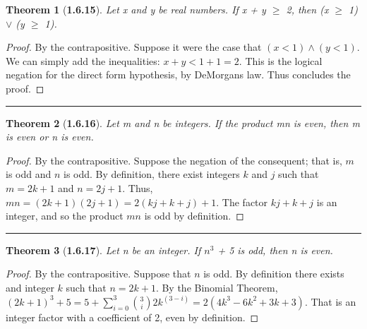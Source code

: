 \documentclass[a4paper, 12pt]{article}
\theoremstyle{plain}
\newtheorem*{theorem*}{Theorem}
\begin{document}
\begin{theorem*}[\textbf{1.6.15}]
    Let x and y be real numbers. If x + y $\ge$ 2, then \newline (x $\ge$ 1) $\lor$ (y $\ge$ 1).
\end{theorem*}

\begin{proof}
    By the contrapositive. Suppose it were the case that \newline $(x < 1) \land (y < 1)$. We can 
    simply add the inequalities: $x + y < 1 + 1 = 2$. This is the logical negation for the direct 
    form hypothesis, by DeMorgans law. Thus concludes the proof.
\end{proof}
\begin{center}
    \rule{5.4in}{1pt}
\end{center}


\begin{theorem*}[\textbf{1.6.16}]
    Let m and n be integers. If the product mn is even, then m is even or n is even.
\end{theorem*}

\begin{proof}
    By the contrapositive. Suppose the negation of the consequent; that is, $m$ is odd and $n$ is odd. 
    By definition, there exist integers $k$ and $j$ such that $m = 2k + 1$ and $n = 2j + 1$. Thus, 
    $mn = (2k + 1)(2j + 1) = 2(kj + k + j) + 1$. The factor $kj + k + j$ is an integer, and so the 
    product $mn$ is odd by definition.
\end{proof}
\begin{center}
    \rule{5.4in}{1pt}
\end{center}


\begin{theorem*}[\textbf{1.6.17}]
    Let n be an integer. If $n^{3}$ + 5 is odd, then n is even.
\end{theorem*}

\begin{proof}
    By the contrapositive. Suppose that $n$ is odd. By definition there exists and integer $k$ such 
    that $n = 2k + 1$. By the Binomial Theorem, 
    $(2k + 1)^{3} + 5 = 5 + \sum\limits_{i=0}^3 {3 \choose i} 2k^{(3-i)} = 2(4k^{3} - 6k^{2} + 3k + 3)$. 
    That is an integer factor with a coefficient of 2, even by definition.
\end{proof}
\end{document}
